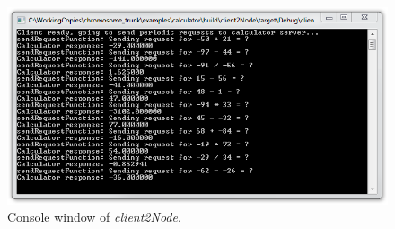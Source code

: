 \begin{figure}[htpb]
	\centering
	\includegraphics[scale=0.7]{figures/example_calculator_client2Node.png}
	\caption{Console window of \emph{client2Node}.}
	\label{fig:example_calculator_client2Node}
\end{figure}
